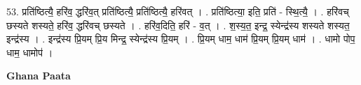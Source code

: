 \documentclass[17pt]{extarticle}
\begin{document}
53. प्रति॑ष्ठित्यै॒ हरि॑व॒ द्धरि॑व॒त् प्रति॑ष्ठित्यै॒ प्रति॑ष्ठित्यै॒ हरि॑वत् । . प्रति॑ष्ठित्या॒ इति॒ प्रति॑ - स्थि॒त्यै॒ । . हरि॑वच् छस्यते शस्यते॒ हरि॑व॒ द्धरि॑वच् छस्यते । . हरि॑व॒दिति॒ हरि॑ - व॒त् । . श॒स्य॒त॒ इन्द्र॒ स्येन्द्र॑स्य शस्यते शस्यत॒ इन्द्र॑स्य । . इन्द्र॑स्य प्रि॒यम् प्रि॒य मिन्द्र॒ स्येन्द्र॑स्य प्रि॒यम् । . प्रि॒यम् धाम॒ धाम॑ प्रि॒यम् प्रि॒यम् धाम॑ । . धामो पोप॒ धाम॒ धामोप॑ । \newline

\textbf{Ghana Paata } \newline
\end{document}
